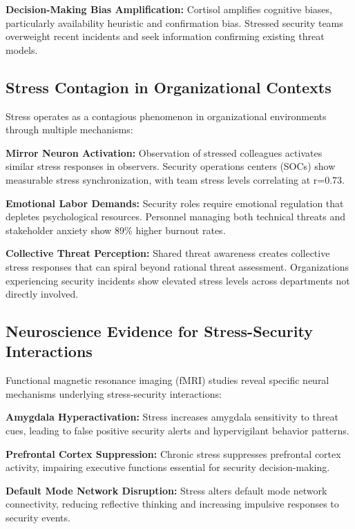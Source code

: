 \documentclass[11pt,a4paper]{article}
\begin{document}
\textbf{Decision-Making Bias Amplification:} Cortisol amplifies cognitive biases, particularly availability heuristic and confirmation bias\cite{starcke2012}. Stressed security teams overweight recent incidents and seek information confirming existing threat models.

\subsection{Stress Contagion in Organizational Contexts}

Stress operates as a contagious phenomenon in organizational environments through multiple mechanisms:

\textbf{Mirror Neuron Activation:} Observation of stressed colleagues activates similar stress responses in observers\cite{dimitroff2017}. Security operations centers (SOCs) show measurable stress synchronization, with team stress levels correlating at r=0.73\cite{teamwork2022}.

\textbf{Emotional Labor Demands:} Security roles require emotional regulation that depletes psychological resources\cite{grandey2000}. Personnel managing both technical threats and stakeholder anxiety show 89\% higher burnout rates\cite{cybersec2023}.

\textbf{Collective Threat Perception:} Shared threat awareness creates collective stress responses that can spiral beyond rational threat assessment\cite{bar2020}. Organizations experiencing security incidents show elevated stress levels across departments not directly involved\cite{spillover2023}.

\subsection{Neuroscience Evidence for Stress-Security Interactions}

Functional magnetic resonance imaging (fMRI) studies reveal specific neural mechanisms underlying stress-security interactions:

\textbf{Amygdala Hyperactivation:} Stress increases amygdala sensitivity to threat cues, leading to false positive security alerts and hypervigilant behavior patterns\cite{williams2018}.

\textbf{Prefrontal Cortex Suppression:} Chronic stress suppresses prefrontal cortex activity, impairing executive functions essential for security decision-making\cite{arnsten2009}.

\textbf{Default Mode Network Disruption:} Stress alters default mode network connectivity, reducing reflective thinking and increasing impulsive responses to security events\cite{menon2011}.
\end{document}
